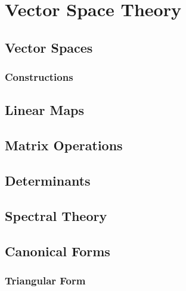 \documentclass[12pt, a4paper, oneside, openright, titlepage]{book}
\begin{document}
\tableofcontents

\part{Vector Space Theory}

\chapter{Vector Spaces}


\begin{subappendices}
    \section{Constructions}
\end{subappendices}

\chapter{Linear Maps}




\chapter{Matrix Operations}



\chapter{Determinants}



\chapter{Spectral Theory}



\chapter{Canonical Forms}

\section{Triangular Form}
\end{document}
